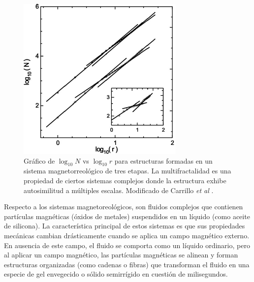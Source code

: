 \begin{figure}[H]
	\begin{center}
		\includegraphics[width=0.5\linewidth]{graphs/Carrillo2003}
		\caption{Gr\'{a}fico de $\log_{10}N$ vs $\log_{10}r$ para estructuras formadas en un sistema magnetorreol\'{o}gico de tres etapas. La multifractalidad es una propiedad de ciertos sistemas complejos donde la estructura exhibe autosimilitud a m\'{u}ltiples  escalas. Modificado de Carrillo \textit{et al} \cite{Carrillo2003}.}
		\label{fig:Carrillo-Fractal}
	\end{center}
\end{figure}

Respecto a los sistemas magnetoreol\'{o}gicos, son fluidos complejos que contienen part\'{i}culas magn\'{e}ticas (\'{o}xidos de metales) suspendidos en un l\'{i}quido (como aceite de silicona). La caracter\'{i}stica principal de estos sistemas es que sus propiedades mec\'{a}nicas cambian dr\'{a}sticamente cuando se aplica un campo magn\'{e}tico externo. En ausencia de este campo, el ﬂuido se comporta como un l\'{i}quido ordinario, pero al aplicar un campo magn\'{e}tico, las part\'{i}culas magn\'{e}ticas se alinean y forman estructuras organizadas (como cadenas o ﬁbras) que transforman el ﬂuido en una especie de gel envegecido o s\'{o}lido semirr\'{i}gido en cuesti\'{o}n de milisegundos. 

 
